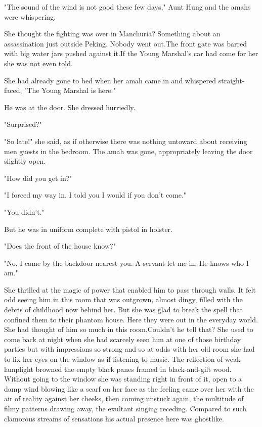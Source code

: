 \par "The sound of the wind is not good these few days," Aunt Hung and the amahs were whispering.
\par She thought the fighting was over in Manchuria? Something about an assassination just outside Peking. Nobody went out.The front gate was barred with big water jars pushed against it.If the Young Marshal's car had come for her she was not even told.
\par She had already gone to bed when her amah came in and whispered straight-faced, "The Young Marshal is here."
\par He was at the door. She dressed hurriedly.
\par "Surprised?"
\par "So late!" she said, as if otherwise there was nothing untoward about receiving men guests in the bedroom. The amah was gone, appropriately leaving the door slightly open.
\par "How did you get in?"
\par "I forced my way in. I told you I would if you don't come."
\par "You didn't."
\par But he was in uniform complete with pistol in holster.
\par "Does the front of the house know?"
\par "No, I came by the backdoor nearest you. A servant let me in. He knows who I am."
\par She thrilled at the magic of power that enabled him to pass through walls. It felt odd seeing him in this room that was outgrown, almost dingy, filled with the debris of childhood now behind her. But she was glad to break the spell that confined them to their phantom house. Here they were out in the everyday world. She had thought of him so much in this room.Couldn't he tell that? She used to come back at night when she had scarcely seen him at one of those birthday parties but with impressions so strong and so at odds with her old room she had to fix her eyes on the window as if listening to music. The reflection of weak lamplight browned the empty black panes framed in black-and-gilt wood. Without going to the window she was standing right in front of it, open to a damp wind blowing like a scarf on her face as the feeling came over her with the air of reality against her cheeks, then coming unstuck again, the multitude of filmy patterns drawing away, the exultant singing receding. Compared to such clamorous streams of sensations his actual presence here was ghostlike.
